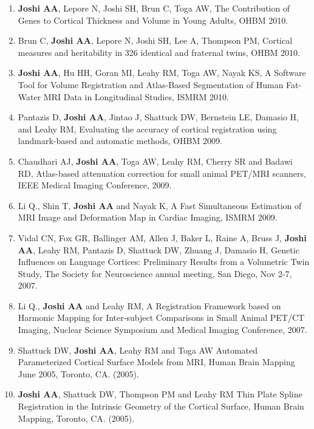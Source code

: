 \documentclass[overlapped,line,letterpaper]{res}
\begin{document}
\begin{resume}
\begin{enumerate}
    \item \textbf{Joshi AA}, Lepore N, Joshi SH, Brun C, Toga AW, The Contribution of Genes to  Cortical Thickness and Volume in Young Adults, OHBM 2010.

    \item Brun C, \textbf{Joshi AA}, Lepore N, Joshi SH, Lee A, Thompson PM, Cortical measures and heritability in 326 identical and fraternal twins, OHBM 2010.

    \item \textbf{Joshi AA}, Hu HH, Goran MI, Leahy RM, Toga AW, Nayak KS, A Software Tool for Volume Registration and Atlas-Based Segmentation of Human Fat-Water MRI Data in Longitudinal Studies, ISMRM 2010.

    \item Pantazis D, \textbf{Joshi AA}, Jintao J, Shattuck DW, Bernstein LE, Damasio H, and Leahy RM, {Evaluating the accuracy of cortical registration using landmark-based and automatic methods}, OHBM 2009.

    \item Chaudhari AJ, \textbf{Joshi AA}, Toga AW, Leahy RM, Cherry SR and Badawi RD, {Atlas-based attenuation correction for small animal PET/MRI scanners}, IEEE Medical Imaging Conference, 2009.

    \item Li Q., Shin T, \textbf{Joshi AA} and Nayak K, {A Fast Simultaneous Estimation of MRI Image and Deformation Map in Cardiac Imaging}, ISMRM 2009. 

    \item Vidal CN, Fox GR, Ballinger AM, Allen J, Baker L, Raine A, Bruss J, \textbf{Joshi AA}, Leahy RM, Pantazis D, Shattuck DW, Zhuang J, Damasio H, {Genetic Influences on Language Cortices: Preliminary Results from a Volumetric Twin Study}, The Society for Neuroscience annual meeting, San Diego, Nov 2-7, 2007.

    \item Li Q., \textbf{Joshi AA} and Leahy RM, {A Registration Framework based on Harmonic Mapping for Inter-subject Comparisons in Small Animal {PET/CT} Imaging}, Nuclear Science Symposium and Medical Imaging Conference, 2007.

    \item Shattuck DW, \textbf{Joshi AA}, Leahy RM and Toga AW {Automated Parameterized Cortical Surface Models from MRI}, Human Brain Mapping June 2005, Toronto, CA. (2005).

    \item \textbf{Joshi AA}, Shattuck DW, Thompson PM and Leahy RM {Thin Plate Spline Registration in the Intrinsic Geometry of the Cortical Surface},  Human Brain Mapping, Toronto, CA. (2005).


\end{enumerate}
\end{resume}
\end{document}
